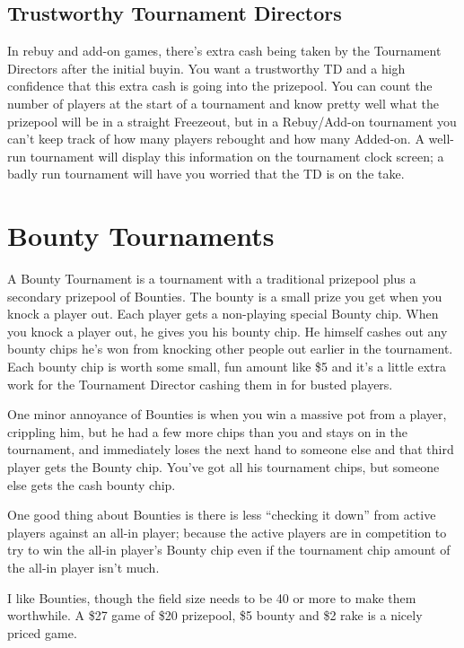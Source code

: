 \subsection{Trustworthy Tournament Directors}

In rebuy and add-on games, there's extra cash being taken by
the Tournament Directors after the initial buyin. You want
a trustworthy TD and a high confidence that this extra cash is
going into the prizepool. You can count the number of players
at the start of a tournament and know pretty well what the prizepool
will be in a straight Freezeout, but in a Rebuy/Add-on tournament
you can't keep track of how many players rebought and how
many Added-on. A well-run tournament will display this
information on the tournament clock screen; a badly run tournament
will have you worried that the TD is on the take.

\section{Bounty Tournaments}

A Bounty Tournament is a tournament with a traditional prizepool
plus a secondary prizepool of Bounties. The bounty
is a small prize you get when you knock a player out.
Each player gets a non-playing special Bounty chip.
When you knock a player out, he gives you his bounty chip.
He himself cashes out any bounty chips he's won from knocking
other people out earlier in the tournament. Each bounty chip is worth
some small, fun amount like \$5 and it's a little extra work for the
Tournament Director cashing them in for busted players.

One minor annoyance of Bounties is when you win a massive pot
from a player, crippling him, but he had a few more chips than
you and stays on in the tournament, and immediately loses the
next hand to someone else and that third player gets the
Bounty chip. You've got all his tournament chips, but someone
else gets the cash bounty chip.

One good thing about Bounties is there is less ``checking it down''
from active players against an all-in player; because the active
players are in competition to try to win the all-in player's
Bounty chip even if the tournament chip amount of the all-in player
isn't much.

I like Bounties, though the field size needs to be 40 or more to
make them worthwhile. A \$27 game of \$20 prizepool, \$5 bounty
and \$2 rake is a nicely priced game.

